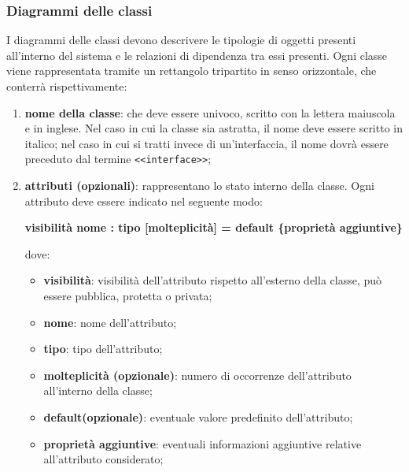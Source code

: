     	\subsubsection*{Diagrammi delle classi}
    	I diagrammi delle classi devono descrivere le tipologie di oggetti presenti all'interno del sistema e le relazioni di dipendenza tra essi presenti.
    	Ogni classe viene rappresentata tramite un rettangolo tripartito in senso orizzontale,
    	che conterrà rispettivamente:
    	\begin{enumerate}
    		\item{\textbf{nome della classe}}: che deve essere univoco, scritto con la lettera maiuscola e in inglese. Nel caso in cui la classe sia astratta, il nome deve essere scritto in italico; nel caso in cui si tratti invece di un'interfaccia, il nome dovrà essere preceduto dal termine \texttt{<<interface>>};

    		\item{\textbf{attributi (opzionali)}}: rappresentano lo stato interno della classe. Ogni attributo deve essere indicato nel seguente modo:
    		\begin{center}
    			\textbf{visibilità nome : tipo [molteplicità] = default \{proprietà aggiuntive\}}
    		\end{center}
    		dove:
    			\begin{itemize}
    				\item{\textbf{visibilità}}: visibilità dell'attributo rispetto all'esterno della classe, può essere pubblica, protetta o privata;
    				\item{\textbf{nome}}: nome dell'attributo;
  					\item{\textbf{tipo}}: tipo dell'attributo;
				\item{\textbf{molteplicità (opzionale)}}: numero di occorrenze dell'attributo all'interno della classe;
				\item{\textbf{default(opzionale)}}: eventuale valore predefinito dell'attributo;
				\item{\textbf{proprietà aggiuntive}}: eventuali informazioni aggiuntive relative all'attributo considerato;
    			\end{itemize}


\end{enumerate}
